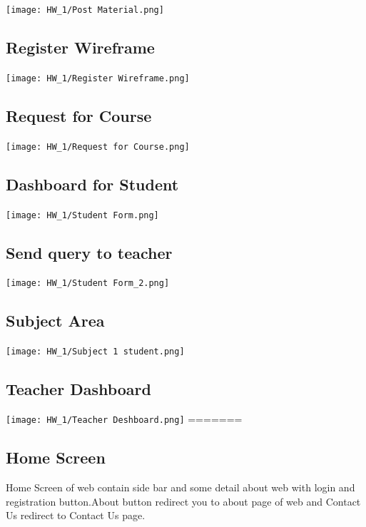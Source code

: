 \texttt{[image: HW\_1/Post Material.png]}

\subsection{Register Wireframe}

\texttt{[image: HW\_1/Register Wireframe.png]}

\subsection{Request for Course}

\texttt{[image: HW\_1/Request for Course.png]}

\subsection{Dashboard for Student}

\texttt{[image: HW\_1/Student Form.png]}

\subsection{Send query to teacher}

\texttt{[image: HW\_1/Student Form\_2.png]}

\subsection{Subject Area}

\texttt{[image: HW\_1/Subject 1 student.png]}

\subsection{Teacher Dashboard}

\texttt{[image: HW\_1/Teacher Deshboard.png]}
=======
\subsection{Home Screen}
\caption{Home Screen of web contain side bar and some detail about web with login and registration button.About button redirect you to about page of web and Contact Us redirect to Contact Us page.}
\\

